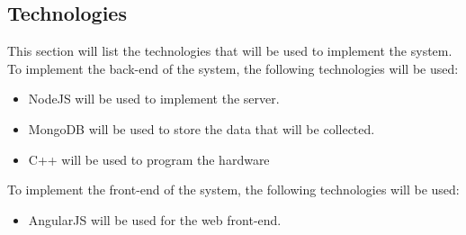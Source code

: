 \documentclass{scrartcl}
\begin{document}
\subsection{Technologies}
This section will list the technologies that will be used to implement the system.\\
To implement the back-end of the system, the following technologies will be used:
\begin{itemize}
    \item NodeJS will be used to implement the server.
    \item MongoDB will be used to store the data that will be collected.
    \item C++ will be used to program the hardware
\end{itemize}
To implement the front-end of the system, the following technologies will be used:
\begin{itemize}
    \item AngularJS will be used for the web front-end.
\end{itemize}
\end{document}
